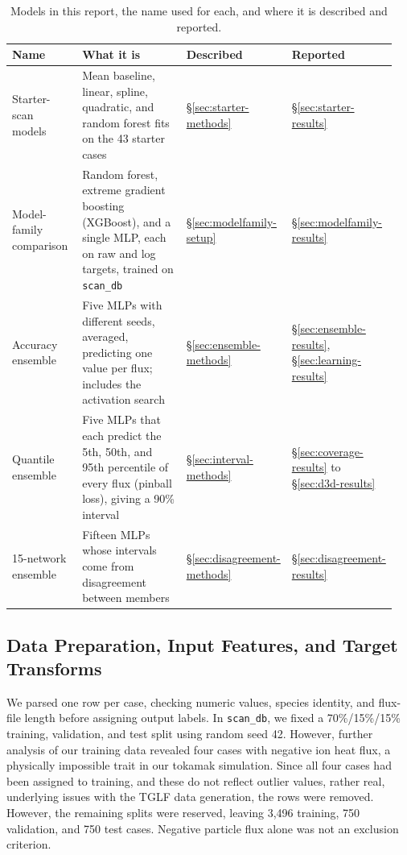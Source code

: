 \documentclass[12pt,letterpaper]{article}
\begin{document}
\begin{table}[htbp]
  \centering
  \small
  \setlength{\tabcolsep}{4pt}
  \begin{tabular}{@{}p{0.2\linewidth}p{0.44\linewidth}p{0.14\linewidth}p{0.17\linewidth}@{}}
    \toprule
    Name                    & What it is                                                                                                          & Described                        & Reported                                                   \\
    \midrule
    Starter-scan models     & Mean baseline, linear, spline, quadratic, and random forest fits on the 43 starter cases                            & \S\ref{sec:starter-methods}      & \S\ref{sec:starter-results}                                \\
    Model-family comparison & Random forest, extreme gradient boosting (XGBoost), and a single MLP, each on raw and log targets, trained on \texttt{scan\_db}                 & \S\ref{sec:modelfamily-setup}    & \S\ref{sec:modelfamily-results}                            \\
    Accuracy ensemble       & Five MLPs with different seeds, averaged, predicting one value per flux; includes the activation search             & \S\ref{sec:ensemble-methods}     & \S\ref{sec:ensemble-results}, \S\ref{sec:learning-results} \\
    Quantile ensemble       & Five MLPs that each predict the 5th, 50th, and 95th percentile of every flux (pinball loss), giving a 90\% interval & \S\ref{sec:interval-methods}     & \S\ref{sec:coverage-results} to \S\ref{sec:d3d-results}    \\
    15-network ensemble     & Fifteen MLPs whose intervals come from disagreement between members                                                 & \S\ref{sec:disagreement-methods} & \S\ref{sec:disagreement-results}                           \\
    \bottomrule
  \end{tabular}
  \caption{Models in this report, the name used for each, and where it is
    described and reported.}
  \label{tab:models}
\end{table}

\subsection{Data Preparation, Input Features, and Target Transforms}

We parsed one row per case, checking numeric values, species identity, and
flux-file length before assigning output labels. In \texttt{scan\_db}, we
fixed a 70\%/15\%/15\% training, validation, and test split using random seed
42. However, further analysis of our training data revealed four cases with
negative ion heat flux, a physically impossible trait in our tokamak simulation.
Since all four cases had been assigned to training, and these do not reflect
outlier values, rather real, underlying issues with the TGLF data generation, the rows were removed.
However, the remaining splits were reserved, leaving 3,496
training, 750 validation, and 750 test cases. Negative particle flux alone
was not an exclusion criterion.
\end{document}
